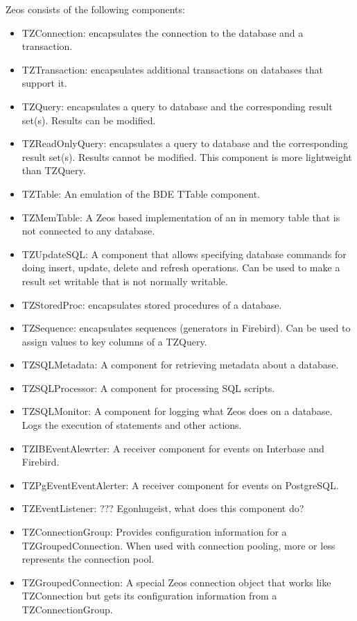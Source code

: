 \documentclass[a4paper,12pt,oneside]{book}
\begin{document}
Zeos consists of the following components:
\begin{itemize}
	\item TZConnection: encapsulates the connection to the database and a transaction.
	\item TZTransaction: encapsulates additional transactions on databases that support it.
	\item TZQuery: encapsulates a query to database and the corresponding result set(s). Results can be modified.
	\item TZReadOnlyQuery: encapsulates a query to database and the corresponding result set(s). Results cannot be modified. This component is more lightweight than TZQuery.
	\item TZTable: An emulation of the BDE TTable component.
	\item TZMemTable: A Zeos based implementation of an in memory table that is not connected to any database.
	\item TZUpdateSQL: A component that allows specifying database commands for doing insert, update, delete and refresh operations.
	  Can be used to make a result set writable that is not normally writable.
	\item TZStoredProc: encapsulates stored procedures of a database.
    \item TZSequence: encapsulates sequences (generators in Firebird).
      Can be used to assign values to key columns of a TZQuery.
	\item TZSQLMetadata: A component for retrieving metadata about a database.
	\item TZSQLProcessor: A component for processing SQL scripts.
	\item TZSQLMonitor: A component for logging what Zeos does on a database.
	  Logs the execution of statements and other actions.
	\item TZIBEventAlewrter:
	  A receiver component for events on Interbase and Firebird.
	\item TZPgEventEventAlerter:
	  A receiver component for events on PostgreSQL.
	\item TZEventListener:
	  ??? Egonhugeist, what does this component do?
	\item TZConnectionGroup:
	   Provides configuration information for a TZGroupedConnection.
	   When used with connection pooling, more or less represents the connection pool.
	\item TZGroupedConnection:
	  A special Zeos connection object that works like TZConnection but gets its configuration information from a TZConnectionGroup.
\end{itemize}
\end{document}
